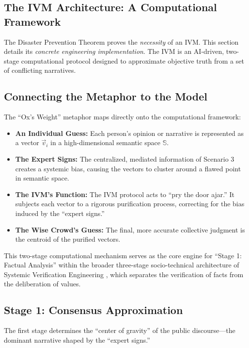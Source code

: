 \documentclass[11pt,a4paper]{article}
\begin{document}
\begin{small}
\section{The IVM Architecture: A Computational Framework}

The Disaster Prevention Theorem proves the \textit{necessity} of an IVM. This section details its \textit{concrete engineering implementation}. The IVM is an AI-driven, two-stage computational protocol designed to approximate objective truth from a set of conflicting narratives.

\subsection{Connecting the Metaphor to the Model}

The ``Ox's Weight'' metaphor maps directly onto the computational framework:

\begin{itemize}
    \item \textbf{An Individual Guess:} Each person's opinion or narrative is represented as a vector $\vec{v}_{i}$ in a high-dimensional semantic space $\mathbb{S}$.
    \item \textbf{The Expert Signs:} The centralized, mediated information of Scenario 3 creates a systemic bias, causing the vectors to cluster around a flawed point in semantic space.
    \item \textbf{The IVM's Function:} The IVM protocol acts to ``pry the door ajar.'' It subjects each vector to a rigorous purification process, correcting for the bias induced by the ``expert signs.''
    \item \textbf{The Wise Crowd's Guess:} The final, more accurate collective judgment is the centroid of the purified vectors.
\end{itemize}

This two-stage computational mechanism serves as the core engine for ``Stage 1: Factual Analysis'' within the broader three-stage socio-technical architecture of Systemic Verification Engineering \citep{Kovnatsky2025SVE2}, which separates the verification of facts from the deliberation of values.

\subsection{Stage 1: Consensus Approximation}

The first stage determines the ``center of gravity'' of the public discourse---the dominant narrative shaped by the ``expert signs.''


\end{small}
\end{document}
